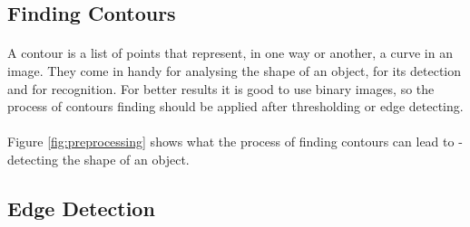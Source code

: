 \subsection{Finding Contours}
\paragraph{}
A contour is a list of points that represent, in one way or another, a curve in an image.\cite{learning-opencv-3} They come in handy for analysing the shape of an object, for its detection and for recognition. For better results it is good to use binary images, so the process of contours finding should be applied after thresholding or edge detecting.

\paragraph{}
Figure \ref{fig:preprocessing} shows what the process of finding contours can lead to - detecting the shape of an object.

\subsection{Edge Detection}
